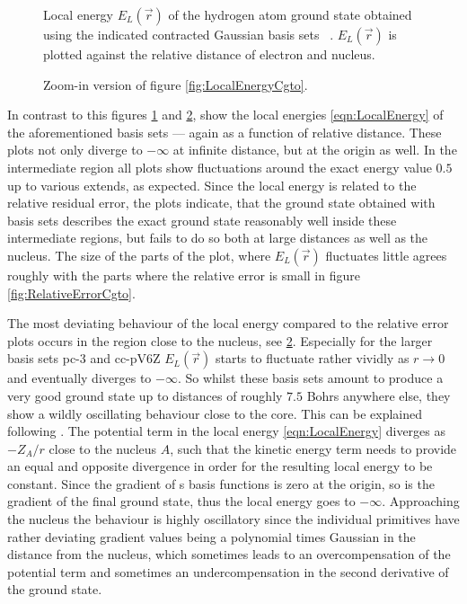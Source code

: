 \begin{figure}[p]
	\centering
	\caption[Local energy of the hydrogen \HF ground state]{
		Local energy $E_L(\vec{r})$ of the hydrogen atom \HF ground state
		obtained using the indicated contracted Gaussian basis sets%
		~\cite{Hehre1969,Dunning1989,Jensen2001,Wilson1996}.
		$E_L(\vec{r})$ is plotted against the relative distance
		of electron and nucleus.
	}
	\label{fig:LocalEnergyCgto}
\end{figure}

\begin{figure}[p]
	\centering
	\caption[Local energy of the hydrogen \HF ground state (close-up)]{
		Zoom-in version of figure \vref{fig:LocalEnergyCgto}.
	}
	\label{fig:LocalEnergyCgtoZoom}
\end{figure}
In contrast to this figures
\ref{fig:LocalEnergyCgto} and \ref{fig:LocalEnergyCgtoZoom},
show the local energies \eqref{eqn:LocalEnergy}
of the aforementioned basis sets --- again as a function of relative distance.
These plots not only diverge to $-\infty$ at infinite distance,
but at the origin as well.
In the intermediate region all plots show fluctuations
around the exact energy value $0.5$ up to various extends,
as expected.
Since the local energy is related to the relative residual error,
the plots indicate,
that the \HF ground state obtained with \cGTO basis sets
describes the exact ground state reasonably well inside these intermediate regions,
but fails to do so both at large distances as well as the nucleus.
The size of the parts of the plot,
where $E_L(\vec{r})$ fluctuates little
agrees roughly with the parts where the relative error is small
in figure \ref{fig:RelativeErrorCgto}.

The most deviating behaviour of the local energy compared to the relative error
plots occurs in the region close to the nucleus,
see \ref{fig:LocalEnergyCgtoZoom}.
Especially for the larger basis sets pc-3 and cc-pV6Z
$E_L(\vec{r})$ starts to fluctuate rather vividly as $r \to 0$
and eventually diverges to $-\infty$.
So whilst these basis sets amount to produce a very good ground state
up to distances of roughly $7.5$ Bohrs anywhere else,
they show a wildly oscillating behaviour close to the core.
This can be explained following \cite{Ma2005}.
The potential term in the local energy \eqref{eqn:LocalEnergy} diverges
as $-Z_A/r$ close to the nucleus $A$,
such that the kinetic energy term needs to provide an equal and opposite
divergence in order for the resulting local energy to be constant.
Since the gradient of {\cGTO}s basis functions is zero at the origin,
so is the gradient of the final \HF ground state,
thus the local energy goes to $-\infty$.
Approaching the nucleus the behaviour is highly oscillatory
since the individual primitives have rather deviating gradient values
being a polynomial times Gaussian in the distance from the nucleus,
which sometimes leads to an overcompensation of the potential term
and sometimes an undercompensation in the second derivative
of the \HF ground state.

